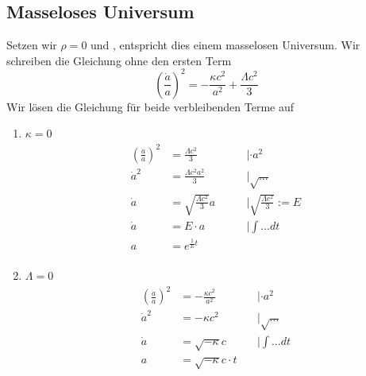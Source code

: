 \begin{refsection}
\subsection{Masseloses Universum}
Setzen wir $\rho = 0$ und , entspricht dies einem masselosen Universum.  Wir schreiben die Gleichung ohne den ersten Term
\[\left(\frac{\dot{a}}{a}\right) ^2 = - \frac{\kappa c^2}{a^2} + \frac{\Lambda c^2}{3}\]
Wir lösen die Gleichung für beide verbleibenden Terme auf
\begin{enumerate}
	\item $\kappa = 0$ 
		\begin{align*}
			\left(\frac{\dot{a}}{a}\right) ^2 &= \frac{\Lambda c^2}{3}  \qquad &| \cdot a^2\\
			\dot{a} ^2 &= \frac{\Lambda c^2 a^2}{3} \qquad &|\sqrt{...}\\
			\dot{a} &= \sqrt{\frac{\Lambda c^2}{3}} a \qquad &|\sqrt{\frac{\Lambda c^2}{3}} := E\\
			\dot{a} &= E \cdot a \qquad &|\int ... dt \\
			a &= e^{\frac{1}{E} t}  &\\
		\end{align*}
		
	\item $\Lambda = 0$ 
		\begin{align*}
			\left(\frac{\dot{a}}{a}\right) ^2 &= - \frac{\kappa c^2}{a^2}  \qquad &| \cdot a^2\\
			\dot{a} ^2 &= - \kappa c^2 \qquad &|\sqrt{...}\\
			\dot{a} &= \sqrt{- \kappa} c \qquad &|\int ... dt\\
			a &= \sqrt{- \kappa} c \cdot t  \\
		\end{align*}
\end{enumerate}


\end{refsection}
